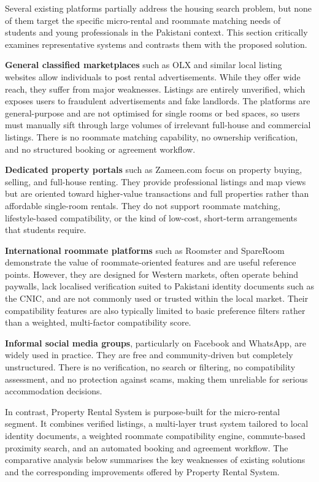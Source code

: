 Several existing platforms partially address the housing search problem, but none of them target the specific micro-rental and roommate matching needs of students and young professionals in the Pakistani context. This section critically examines representative systems and contrasts them with the proposed solution.

\textbf{General classified marketplaces} such as OLX \cite{olx} and similar local listing websites allow individuals to post rental advertisements. While they offer wide reach, they suffer from major weaknesses. Listings are entirely unverified, which exposes users to fraudulent advertisements and fake landlords. The platforms are general-purpose and are not optimised for single rooms or bed spaces, so users must manually sift through large volumes of irrelevant full-house and commercial listings. There is no roommate matching capability, no ownership verification, and no structured booking or agreement workflow.

\textbf{Dedicated property portals} such as Zameen.com \cite{zameen} focus on property buying, selling, and full-house renting. They provide professional listings and map views but are oriented toward higher-value transactions and full properties rather than affordable single-room rentals. They do not support roommate matching, lifestyle-based compatibility, or the kind of low-cost, short-term arrangements that students require.

\textbf{International roommate platforms} such as Roomster \cite{roomster} and SpareRoom \cite{spareroom} demonstrate the value of roommate-oriented features and are useful reference points. However, they are designed for Western markets, often operate behind paywalls, lack localised verification suited to Pakistani identity documents such as the CNIC, and are not commonly used or trusted within the local market. Their compatibility features are also typically limited to basic preference filters rather than a weighted, multi-factor compatibility score.

\textbf{Informal social media groups}, particularly on Facebook and WhatsApp, are widely used in practice. They are free and community-driven but completely unstructured. There is no verification, no search or filtering, no compatibility assessment, and no protection against scams, making them unreliable for serious accommodation decisions.

In contrast, Property Rental System is purpose-built for the micro-rental segment. It combines verified listings, a multi-layer trust system tailored to local identity documents, a weighted roommate compatibility engine, commute-based proximity search, and an automated booking and agreement workflow. The comparative analysis below summarises the key weaknesses of existing solutions and the corresponding improvements offered by Property Rental System.

